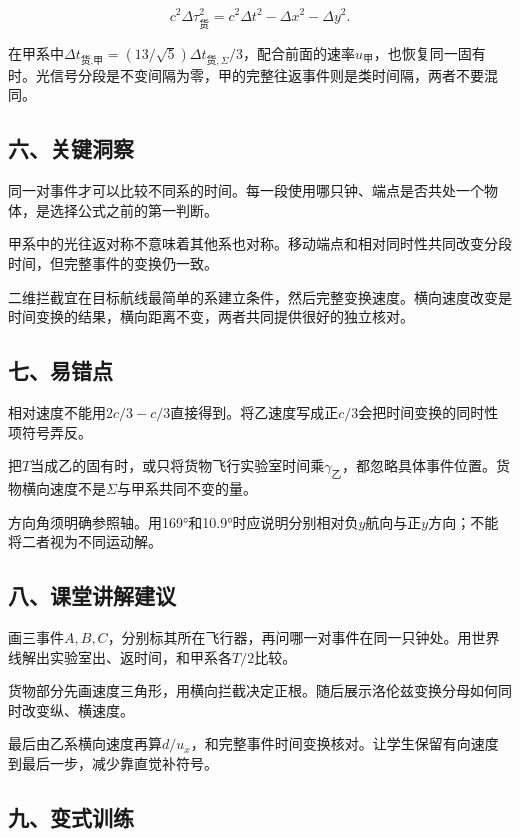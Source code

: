 \documentclass[12pt,a4paper,fontset=fandol]{ctexart}
\begin{document}
\[
c^2\Delta\tau_{\text{货}}^2
=c^2\Delta t^2-\Delta x^2-\Delta y^2.
\]

在甲系中\(\Delta t_{\text{货},\text{甲}}=(13/\sqrt5)\Delta t_{\text{货},\Sigma}/3\)，配合前面的速率\(u_\text{甲}\)，也恢复同一固有时。光信号分段是不变间隔为零，甲的完整往返事件则是类时间隔，两者不要混同。

\subsection{六、关键洞察}\label{ux516dux5173ux952eux6d1eux5bdf-4}

同一对事件才可以比较不同系的时间。每一段使用哪只钟、端点是否共处一个物体，是选择公式之前的第一判断。

甲系中的光往返对称不意味着其他系也对称。移动端点和相对同时性共同改变分段时间，但完整事件的变换仍一致。

二维拦截宜在目标航线最简单的系建立条件，然后完整变换速度。横向速度改变是时间变换的结果，横向距离不变，两者共同提供很好的独立核对。

\subsection{七、易错点}\label{ux4e03ux6613ux9519ux70b9-4}

相对速度不能用\(2c/3-c/3\)直接得到。将乙速度写成正\(c/3\)会把时间变换的同时性项符号弄反。

把\(T\)当成乙的固有时，或只将货物飞行实验室时间乘\(\gamma_\text{乙}\)，都忽略具体事件位置。货物横向速度不是\(\Sigma\)与甲系共同不变的量。

方向角须明确参照轴。用169°和10.9°时应说明分别相对负\(y\)航向与正\(y\)方向；不能将二者视为不同运动解。

\subsection{八、课堂讲解建议}\label{ux516bux8bfeux5802ux8bb2ux89e3ux5efaux8bae-4}

画三事件\(A,B,C\)，分别标其所在飞行器，再问哪一对事件在同一只钟处。用世界线解出实验室出、返时间，和甲系各\(T/2\)比较。

货物部分先画速度三角形，用横向拦截决定正根。随后展示洛伦兹变换分母如何同时改变纵、横速度。

最后由乙系横向速度再算\(d/u_x\)，和完整事件时间变换核对。让学生保留有向速度到最后一步，减少靠直觉补符号。

\subsection{九、变式训练}\label{ux4e5dux53d8ux5f0fux8badux7ec3-4}
\end{document}
